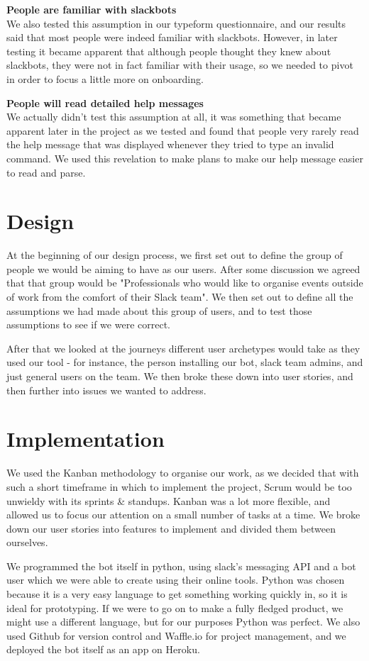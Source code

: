 \documentclass[12pt]{report}
\begin{document}
\textbf{People are familiar with slackbots}\\
We also tested this assumption in our typeform questionnaire, and our results said that most people were indeed familiar with slackbots. However, in later testing it became apparent that although people thought they knew about slackbots, they were not in fact familiar with their usage, so we needed to pivot in order to focus a little more on onboarding.

\textbf{People will read detailed help messages}\\
We actually didn't test this assumption at all, it was something that became apparent later in the project as we tested and found that people very rarely read the help message that was displayed whenever they tried to type an invalid command. We used this revelation to make plans to make our help message easier to read and parse.

\section{Design}
At the beginning of our design process, we first set out to define the group of people we would be aiming to have as our users. After some discussion we agreed that that group would be "Professionals who would like to organise events outside of work from the comfort of their Slack team". We then set out to define all the assumptions we had made about this group of users, and to test those assumptions to see if we were correct.

After that we looked at the journeys different user archetypes would take as they used our tool - for instance, the person installing our bot, slack team admins, and just general users on the team. We then broke these down into user stories, and then further into issues we wanted to address.

\section{Implementation}
We used the Kanban methodology to organise our work, as we decided that with such a short timeframe in which to implement the project, Scrum would be too unwieldy with its sprints \& standups. Kanban was a lot more flexible, and allowed us to focus our attention on a small number of tasks at a time. We broke down our user stories into features to implement and divided them between ourselves.

We programmed the bot itself in python, using slack's messaging API and a bot user which we were able to create using their online tools. Python was chosen because it is a very easy language to get something working quickly in, so it is ideal for prototyping. If we were to go on to make a fully fledged product, we might use a different language, but for our purposes Python was perfect. We also used Github for version control and Waffle.io for project management, and we deployed the bot itself as an app on Heroku.
\end{document}
